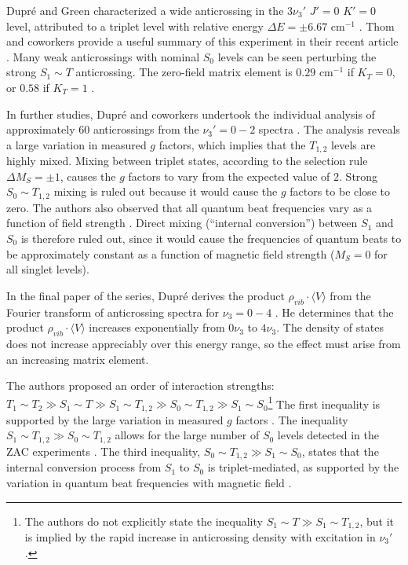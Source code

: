 Dupr\'{e} and Green characterized a wide anticrossing in the $3\nu_3'$
$J'=0$ $K'=0$ level, attributed to a triplet level with relative
energy $\Delta E = \pm 6.67$ cm$^{-1}$ \cite{dupre93}.  Thom and
coworkers provide a useful summary of this experiment in their recent
article \cite{thom07}.  Many weak anticrossings with nominal $S_0$
levels can be seen perturbing the strong $S_1 \sim T$ anticrossing.
The zero-field matrix element is $0.29$ cm$^{-1}$ if $K_{T}=0$, or
$0.58$ if $K_{T}=1$ \cite{thom07}.

In further studies, Dupr\'{e} and coworkers undertook the individual
analysis of approximately 60 anticrossings from the $\nu_3'=0-2$
spectra \cite{dupre95a}.  The analysis reveals a large variation in
measured $g$ factors, which implies that the $T_{1,2}$ levels are
highly mixed.  Mixing between triplet states, according to the
selection rule $\Delta M_S = \pm 1$, causes the $g$ factors to vary
from the expected value of $2$.  Strong $S_0 \sim T_{1,2}$ mixing is
ruled out because it would cause the $g$ factors to be close to zero.
The authors also observed that all quantum beat frequencies vary as a
function of field strength \cite{dupre95a}.  Direct mixing (``internal
conversion'') between $S_1$ and $S_0$ is therefore ruled out, since
it would cause the frequencies of quantum beats to be approximately
constant as a function of magnetic field strength ($M_S=0$ for all
singlet levels).

In the final paper of the series, Dupr\'{e} derives the product
$\rho_{vib} \cdot \langle V \rangle$ from the Fourier transform of
anticrossing spectra for $\nu_3=0-4$ \cite{dupre95b}.  He determines
that the product $\rho_{vib} \cdot \langle V \rangle$ increases
exponentially from $0\nu_3$ to $4\nu_3$.  The density of states does
not increase appreciably over this energy range, so the effect must
arise from an increasing matrix element.

The authors proposed an order of interaction strengths: $T_1 \sim T_2
\gg S_1 \sim T \gg S_1 \sim T_{1,2} \gg S_0 \sim T_{1,2} \gg S_1 \sim
S_0$\footnote{The authors do not explicitly state the inequality $S_1
  \sim T \gg S_1 \sim T_{1,2}$, but it is implied by the rapid
  increase in anticrossing density with excitation in $\nu_3'$.}
\cite{dupre95b} The first inequality is supported by the large
variation in measured $g$ factors \cite{dupre95a}.  The inequality
$S_1 \sim T_{1,2} \gg S_0 \sim T_{1,2}$ allows for the large number of
$S_0$ levels detected in the ZAC experiments \cite{dupre91}.  The
third inequality, $S_0 \sim T_{1,2} \gg S_1 \sim S_0$, states that the
internal conversion process from $S_1$ to $S_0$ is triplet-mediated,
as supported by the variation in quantum beat frequencies with
magnetic field \cite{dupre95a}.

